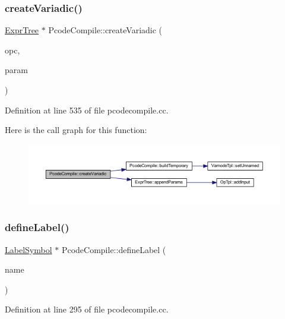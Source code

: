 \subsubsection{\texorpdfstring{createVariadic()}{createVariadic()}}
{\footnotesize\ttfamily \mbox{\hyperlink{class_expr_tree}{Expr\+Tree}} $\ast$ Pcode\+Compile\+::create\+Variadic (\begin{DoxyParamCaption}\item[{\mbox{\hyperlink{opcodes_8hh_abeb7dfb0e9e2b3114e240a405d046ea7}{Op\+Code}}}]{opc,  }\item[{vector$<$ \mbox{\hyperlink{class_expr_tree}{Expr\+Tree}} $\ast$ $>$ $\ast$}]{param }\end{DoxyParamCaption})}



Definition at line 535 of file pcodecompile.\+cc.

Here is the call graph for this function\+:
\nopagebreak
\begin{figure}[H]
\begin{center}
\leavevmode
\includegraphics[width=350pt]{class_pcode_compile_aef3dea1541f9dc0c120ac7f232c0e078_cgraph}
\end{center}
\end{figure}
\mbox{\label{class_pcode_compile_a2398d38e48c70e73eab926baf160f2d0}} 
\subsubsection{\texorpdfstring{defineLabel()}{defineLabel()}}
{\footnotesize\ttfamily \mbox{\hyperlink{class_label_symbol}{Label\+Symbol}} $\ast$ Pcode\+Compile\+::define\+Label (\begin{DoxyParamCaption}\item[{string $\ast$}]{name }\end{DoxyParamCaption})}



Definition at line 295 of file pcodecompile.\+cc.

\mbox{\label{class_pcode_compile_a7844bb12a59ed9998354ed9328e18f90}} 
